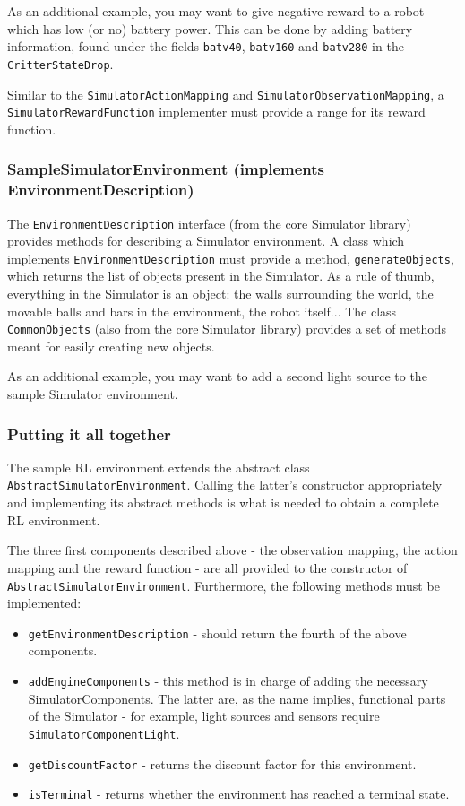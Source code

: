 \documentclass[12pt]{article}
\newcommand{\code}[1]{\texttt{#1}}
\begin{document}
As an additional example, you may want to give negative reward to a robot
which has low (or no) battery power. This can be done by adding battery 
information, found under the fields \verb+batv40+, \verb+batv160+ and
\verb+batv280+ in the \code{CritterStateDrop}.

Similar to the \code{SimulatorActionMapping} and 
\code{SimulatorObservationMapping}, a \\ \code{SimulatorRewardFunction}
implementer must provide a range for its reward function.

\subsubsection[SampleSimulatorEnvironment]{SampleSimulatorEnvironment (implements EnvironmentDescription)} 

The \code{EnvironmentDescription} interface (from the core Simulator library)
provides methods for describing a Simulator environment. A class which 
implements \code{EnvironmentDescription} must provide a method,
\code{generateObjects}, which returns the list of objects present in the
Simulator. As a rule of thumb, everything in the Simulator is an object:
the walls surrounding the world, the movable balls and bars in the
environment, the robot itself... The class \code{CommonObjects} (also from
the core Simulator library) provides a set of methods meant for easily
creating new objects.

As an additional example, you may want to add a second light source to the
sample Simulator environment.

\subsubsection{Putting it all together}

The sample RL environment extends the abstract class 
\code{AbstractSimulatorEnvironment}. Calling the latter's constructor 
appropriately and implementing its abstract methods is what is needed
to obtain a complete RL environment.

The three first components described above - the observation mapping, the
action mapping and the reward function - are all provided to the 
constructor of \code{AbstractSimulatorEnvironment}. Furthermore, the
following methods must be implemented:

\begin{itemize}
\item{\code{getEnvironmentDescription} - should return the fourth of the above components.}
\item{\code{addEngineComponents} - this method is in charge of adding the necessary SimulatorComponents. The latter are, as the name implies, functional parts of the Simulator - for example, light sources and sensors require \code{SimulatorComponentLight}.}
\item{\code{getDiscountFactor} - returns the discount factor for this environment.}
\item{\code{isTerminal} - returns whether the environment has reached a terminal state.}
\end{itemize}
\end{document}
